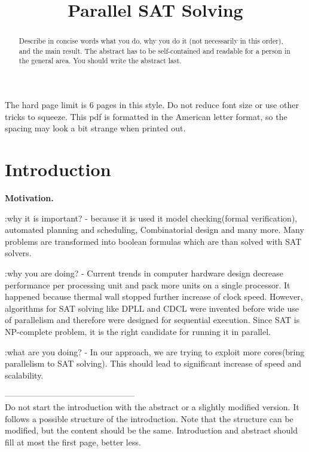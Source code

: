 \documentclass[letterpaper]{article}
\title{Parallel SAT Solving}
\newcommand{\mypar}[1]{{\bf #1.}}
\begin{document}
%
\maketitle
%

The hard page limit is 6 pages in this style. Do not reduce font size
or use other tricks to squeeze. This pdf is formatted in the American letter format, so the spacing may look a bit strange when printed out.

\begin{abstract}
Describe in concise words what you do, why you do it (not necessarily
in this order), and the main result.  The abstract has to be
self-contained and readable for a person in the general area. You
should write the abstract last.
\end{abstract}

\section{Introduction}\label{sec:intro}

\mypar{Motivation}


:why it is important? - because it is used it model checking(formal verification), automated planning and scheduling, Combinatorial design and many more. Many problems are transformed into boolean formulas which are than solved with SAT solvers.

:why you are doing? - Current trends in computer hardware design decrease performance per processing unit and pack more units on a single processor. It happened because thermal wall stopped further increase of clock speed. However, algorithms for SAT solving like DPLL and CDCL were invented before wide use of parallelism and therefore were designed for sequential execution. Since SAT is NP-complete problem, it is the right candidate for running it in parallel.

:what are you doing? - In our approach, we are trying to exploit more cores(bring parallelism to SAT solving). This should lead to significant increase of speed and scalability. 

-----------------------------------------------\\

Do not start the introduction with the abstract or a slightly modified
version. It follows a possible structure of the introduction. 
Note that the structure can be modified, but the
content should be the same. Introduction and abstract should fill at most the first page, better less.
\end{document}
